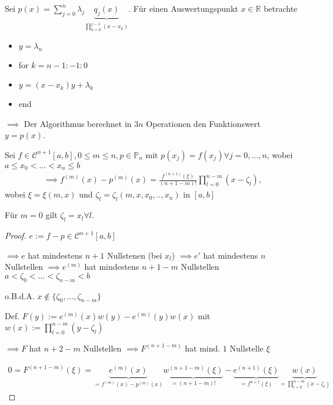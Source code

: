 \begin{lemma}
	Sei $p(x) = \sum_{j=0}^{n} \lambda_j \underbrace{q_j(x)}_{\prod_{k=0}^{j-1}(x-x_k)}$. Für einen Auswertungspunkt $x \in \mathbb{R}$ betrachte
	\begin{itemize}
		\item $y = \lambda_n$
		\item for $k=n-1:-1:0$
		\item \hspace{0.5cm} $y = (x-x_k)y + \lambda_k$
		\item end
	\end{itemize}
	
	$\implies$ Der Algorithmus berechnet in $3n$ Operationen den Funktionswert $y=p(x)$.
\end{lemma}

\begin{theorem}[Interpolationsfehlerdarstellung]
	Sei $f \in \mathcal{C}^{n+1}[a,b], 0 \leq m \leq n, p \in \mathbb{P}_n$ mit $p(x_j) = f(x_j) \forall j=0, ..., n$, wobei $a \leq x_0 < ... < x_n \leq b$
	\begin{align*}
		\implies f^{(m)}(x) - p^{(m)}(x) = \frac{f^{(n+1)}(\xi)}{(n+1-m)!} \prod_{l=0}^{n-m}(x-\zeta_l),
	\end{align*}
	wobei $\xi = \xi(m,x)$ und $\zeta_l = \zeta_l(m,x,x_0,..,x_n)$ in $[a,b]$
	
	Für $m=0$ gilt $\zeta_l = x_l \forall l$.
\end{theorem}

\begin{proof}
	$e := f-p \in \mathcal{C}^{n+1}[a,b]$
	
	$\implies e$ hat mindestens $n+1$ Nullstenen (bei $x_l$) $\implies e'$ hat mindestens $n$ Nullstellen $\implies e^{(m)}$ hat mindestens $n+1-m$ Nullstellen $a < \zeta_0 < ... < \zeta_{n-m} < b$
	
	o.B.d.A. $x \notin \{\zeta_0, ..., \zeta_{n-m}\}$
	
	Def. $F(y) := e^{(m)}(x)w(y) - e^{(m)}(y) w(x)$ mit $w(x) := \prod_{l=0}^{n-m}(y-\zeta_l)$
	
	$\implies F$ hat $n+2-m$ Nullstellen $\implies F^{(n+1-m)}$ hat mind. $1$ Nullstelle $\xi$
	
	\begin{align*}
		0 = F^{(n+1-m)}(\xi) = \underbrace{e^{(m)}(x)}_{=f^{(m)}(x) - p^{(m)}(x)} \underbrace{w^{(n+1-m)}(\xi)}_{=(n+1-m)!} - \underbrace{e^{(n+1)}(\xi)}_{=f^{n+1}(\xi)} \underbrace{w(x)}_{=\prod_{l=0}^{n-m}(x-\zeta_l)}
	\end{align*}
\end{proof}

